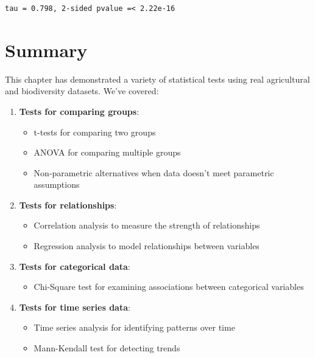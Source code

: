 \documentclass[
  letterpaper,
]{book}
\providecommand{\tightlist}{%
  \setlength{\itemsep}{0pt}\setlength{\parskip}{0pt}}
\begin{document}
\begin{verbatim}
tau = 0.798, 2-sided pvalue =< 2.22e-16
\end{verbatim}

\section{Summary}\label{summary-4}

This chapter has demonstrated a variety of statistical tests using real
agricultural and biodiversity datasets. We've covered:

\begin{enumerate}
\def\labelenumi{\arabic{enumi}.}
\tightlist
\item
  \textbf{Tests for comparing groups}:

  \begin{itemize}
  \tightlist
  \item
    t-tests for comparing two groups
  \item
    ANOVA for comparing multiple groups
  \item
    Non-parametric alternatives when data doesn't meet parametric
    assumptions
  \end{itemize}
\item
  \textbf{Tests for relationships}:

  \begin{itemize}
  \tightlist
  \item
    Correlation analysis to measure the strength of relationships
  \item
    Regression analysis to model relationships between variables
  \end{itemize}
\item
  \textbf{Tests for categorical data}:

  \begin{itemize}
  \tightlist
  \item
    Chi-Square test for examining associations between categorical
    variables
  \end{itemize}
\item
  \textbf{Tests for time series data}:

  \begin{itemize}
  \tightlist
  \item
    Time series analysis for identifying patterns over time
  \item
    Mann-Kendall test for detecting trends
  \end{itemize}
\end{enumerate}
\end{document}
